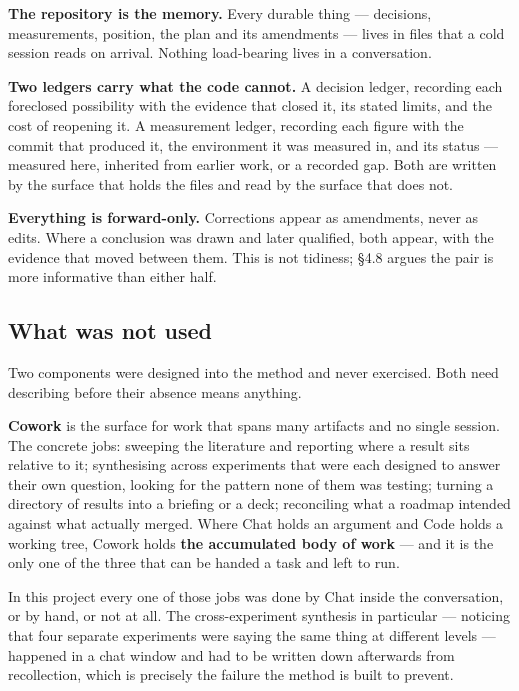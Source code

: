 \textbf{The repository is the memory.} Every durable thing --- decisions, measurements, position, the plan and its amendments --- lives in files that a cold session reads on arrival. Nothing load-bearing lives in a conversation.

\textbf{Two ledgers carry what the code cannot.} A decision ledger, recording each foreclosed possibility with the evidence that closed it, its stated limits, and the cost of reopening it. A measurement ledger, recording each figure with the commit that produced it, the environment it was measured in, and its status --- measured here, inherited from earlier work, or a recorded gap. Both are written by the surface that holds the files and read by the surface that does not.

\textbf{Everything is forward-only.} Corrections appear as amendments, never as edits. Where a conclusion was drawn and later qualified, both appear, with the evidence that moved between them. This is not tidiness; \S4.8 argues the pair is more informative than either half.

\subsection{What was not used}

Two components were designed into the method and never exercised. Both need describing before their absence means anything.

\textbf{Cowork} is the surface for work that spans many artifacts and no single session. The concrete jobs: sweeping the literature and reporting where a result sits relative to it; synthesising across experiments that were each designed to answer their own question, looking for the pattern none of them was testing; turning a directory of results into a briefing or a deck; reconciling what a roadmap intended against what actually merged. Where Chat holds an argument and Code holds a working tree, Cowork holds \textbf{the accumulated body of work} --- and it is the only one of the three that can be handed a task and left to run.

In this project every one of those jobs was done by Chat inside the conversation, or by hand, or not at all. The cross-experiment synthesis in particular --- noticing that four separate experiments were saying the same thing at different levels --- happened in a chat window and had to be written down afterwards from recollection, which is precisely the failure the method is built to prevent.

